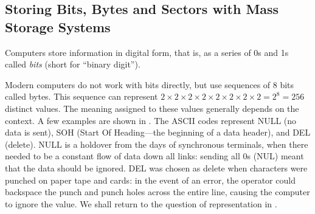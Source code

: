 \subsection{Storing Bits, Bytes and Sectors with Mass Storage Systems}

Computers store information in digital form, that is, as a series of
0s and 1s called \emph{bits} (short for ``binary digit'').

Modern computers do not work with bits directly, but use sequences of
8 bits called bytes. This sequence can represent
$2\times2\times2\times2\times2\times2\times2\times2=2^8=256$ distinct
values. The meaning assigned to these values generally depends on the
context. A few examples are shown in . The ASCII
codes represent NULL (no data is sent), SOH (Start Of Heading---the
beginning of a data header), and DEL (delete). NULL is a holdover from
the days of synchronous terminals, when there needed to be a constant
flow of data down all links: sending all 0s (NUL) meant that the data
should be ignored. DEL was chosen as delete when characters were
punched on paper tape and cards: in the event of an error, the
operator could backspace the punch and punch holes across the entire
line, causing the computer to ignore the value. We shall return
to the question of representation in .

